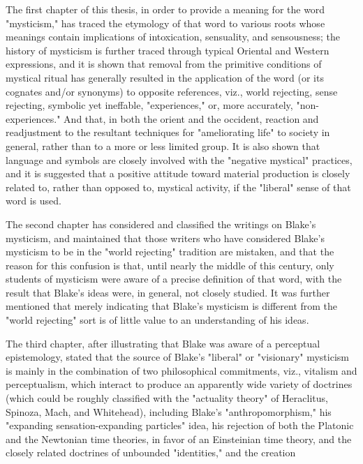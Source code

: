 The first chapter of this thesis, in order to provide a meaning for the word "mysticism," has traced the etymology 
of that word to various roots whose meanings contain implications of intoxication, sensuality, and sensousness; the 
history of mysticism is further traced through typical Oriental and Western expressions, and it is shown that removal
from the primitive conditions of mystical ritual has generally resulted in the application of the word (or its cognates and/or synonyms) to 
opposite references, viz., world rejecting, sense rejecting, symbolic yet ineffable, "experiences," or,
more accurately, "non-experiences." And that, in both the orient and the occident, reaction and readjustment to the 
resultant techniques for "ameliorating life" to society in general, rather than to a more or less
limited group. It is also shown that language and symbols are closely involved with the "negative mystical" practices,
and it is suggested that a positive attitude toward material production is closely related to, rather than opposed to,
mystical activity, if the "liberal" sense of that word is used.\par
\vspace*{0.5\baselineskip}
The second chapter has considered and classified the writings on Blake's mysticism, and maintained that those
writers who have considered Blake's mysticism to be in the "world rejecting" tradition are mistaken,
and that the reason for this confusion is that, until nearly the middle of this century, only students of mysticism were aware of a precise
definition of that word, with the result that Blake's ideas were, in general, not closely studied. It was further mentioned that 
merely indicating that Blake's mysticism is different from the "world rejecting" sort is of little value to an understanding of his ideas.\par
\vspace*{0.5\baselineskip}
The third chapter, after illustrating that Blake was aware of a perceptual epistemology, stated that the source of Blake's
"liberal" or "visionary" mysticism is mainly in the combination of two philosophical commitments, viz.,
vitalism and perceptualism, which interact to produce an apparently wide variety of doctrines (which could be roughly
classified with the "actuality theory" of Heraclitus, Spinoza, Mach, and Whitehead), including Blake's "anthropomorphism,"
his "expanding sensation-expanding particles" idea, his rejection of both the Platonic and the Newtonian time theories, in favor
of an Einsteinian time theory, and the closely related doctrines of unbounded "identities," and the creation
